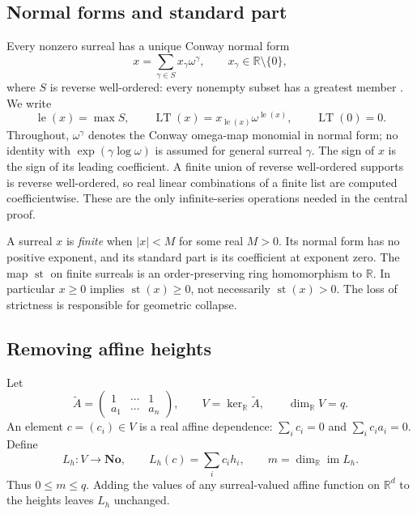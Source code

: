 \documentclass[11pt,a4paper]{article}
\numberwithin{equation}{section}
\theoremstyle{plain}
\newcommand{\No}{\mathbf{No}}
\newcommand{\R}{\mathbb R}
\newcommand{\st}{\operatorname{st}}
\newcommand{\LT}{\operatorname{LT}}
\newcommand{\im}{\operatorname{im}}
\newcommand{\Atil}{\widetilde A}
\begin{document}
\subsection{Normal forms and standard part}

Every nonzero surreal has a unique Conway normal form
\begin{equation}\label{poly:eq:normal}
 x=\sum_{\gamma\in S}x_\gamma\omega^\gamma,
 \qquad x_\gamma\in\R\setminus\{0\},
\end{equation}
where $S$ is reverse well-ordered: every nonempty subset has a greatest
member \cite{fs:Gonshor}. We write
\[
 \operatorname{le}(x)=\max S,\qquad
 \LT(x)=x_{\operatorname{le}(x)}\omega^{\operatorname{le}(x)},
 \qquad \LT(0)=0.
\]
Throughout, $\omega^\gamma$ denotes the Conway omega-map monomial in
normal form; no identity with $\exp(\gamma\log\omega)$ is assumed for
general surreal $\gamma$. The sign of $x$ is the sign of its leading coefficient. A finite union of
reverse well-ordered supports is reverse well-ordered, so real linear
combinations of a finite list are computed coefficientwise. These are the
only infinite-series operations needed in the central proof.

A surreal $x$ is \emph{finite} when $|x|<M$ for some real $M>0$. Its normal
form has no positive exponent, and its standard part is its coefficient at
exponent zero. The map $\st$ on finite surreals is an order-preserving ring
homomorphism to $\R$. In particular $x\ge0$ implies $\st(x)\ge0$, not
necessarily $\st(x)>0$. The loss of strictness is responsible for geometric
collapse.

\subsection{Removing affine heights}

Let
\[
 \Atil=
 \begin{pmatrix}1&\cdots&1\\ a_1&\cdots&a_n\end{pmatrix},
 \qquad V=\ker_{\R}\Atil,
 \qquad \dim_{\R}V=q.
\]
An element $c=(c_i)\in V$ is a real affine dependence:
$\sum_i c_i=0$ and $\sum_i c_i a_i=0$. Define
\begin{equation}\label{poly:eq:Lh}
 L_h:V\longrightarrow\No,
 \qquad L_h(c)=\sum_i c_i h_i,
 \qquad m=\dim_{\R}\im L_h.
\end{equation}
Thus $0\le m\le q$. Adding the values of any surreal-valued affine function
on $\R^d$ to the heights leaves $L_h$ unchanged.
\end{document}
